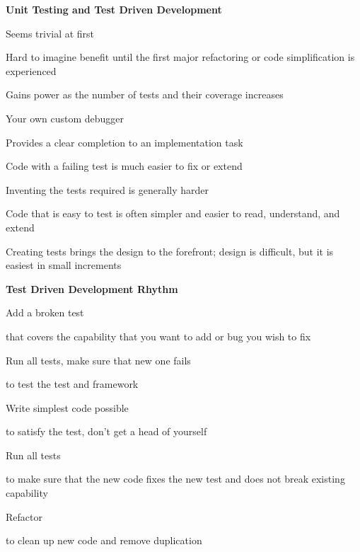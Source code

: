 \documentclass[landscape]{slides}
\renewcommand{\title}[1]{{\large\bfseries #1}}
\newenvironment{itemiz}%
  {\begin{list}{}{\raggedright
      \setlength{\itemsep}{2pt}%
      \setlength{\parskip}{4pt}\setlength{\parsep}{2pt}}}%
  {\end{list}}%
\begin{document}
 \begin{slide}
   \title{ Unit Testing and Test Driven Development}
   \begin{itemiz}
   \item Seems trivial at first
   \item Hard to imagine benefit until the first major refactoring or
     code simplification is experienced
   \item Gains power as the number of tests and their coverage increases
   \item Your own custom debugger
   \item Provides a clear completion to an implementation task
   \item Code with a failing test is much easier to fix or extend
   \item Inventing the tests required is generally harder
   \item Code that is easy to test is often simpler and easier to
   read, understand, and extend
   \item Creating tests brings the design to the forefront; design is
   difficult, but it is easiest in small increments
   \end{itemiz}
 \end{slide}

 \begin{slide}
   \title{Test Driven Development Rhythm}
   \begin{itemiz}
   \item Add a broken test
     \begin{itemiz}
     \item that covers the capability that you want to add or bug you wish to fix
     \end{itemiz}
   \item Run all tests, make sure that new one fails
     \begin{itemiz}
     \item to test the test and framework
     \end{itemiz}
   \item Write simplest code possible
     \begin{itemiz}
     \item to satisfy the test, don't get a head of yourself
     \end{itemiz}
   \item Run all tests
     \begin{itemiz}
     \item to make sure that the new code fixes the new test and does not break
  existing capability
     \end{itemiz}
   \item Refactor
     \begin{itemiz}
     \item to clean up new code and remove duplication
     \end{itemiz}
   \end{itemiz}
 \end{slide}
 
\end{document}
